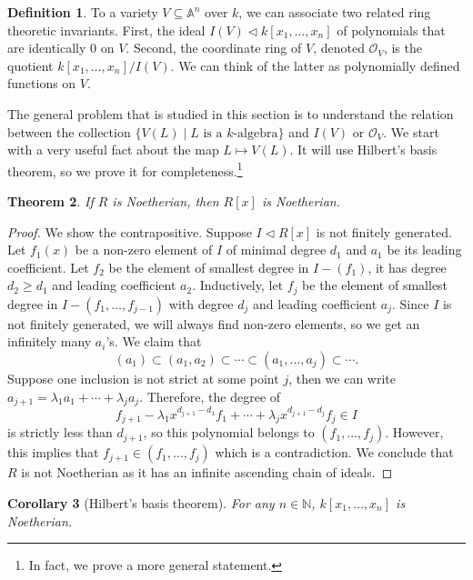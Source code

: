 \documentclass{tufte-handout} %
\newtheorem{thm}{Theorem}
\newtheorem{cor}[thm]{Corollary}
\theoremstyle{definition}
\newtheorem{defn}[thm]{Definition}
\theoremstyle{remark}
\newtheorem{rem}[thm]{Remark}
\newcommand{\N}{\mathbb{N}}
\newcommand{\bA}{\mathbb{A}}
\newcommand{\mO}{\mathcal{O}}
\begin{document}
\begin{defn}
	To a variety $V \subseteq \bA^n$ over $k$, we can associate two related ring theoretic invariants. First, the ideal $I(V) \lhd k[x_1, \dots, x_n]$ of polynomials that are identically $0$ on $V$. Second, the coordinate ring of $V$, denoted $\mO_V$, is the quotient $k[x_1, \dots, x_n]/I(V)$. We can think of the latter as polynomially defined functions on $V$.
\end{defn}


The general problem that is studied in this section is to understand the relation between the collection \(\{V(L) \mid L \text{ is a $k$-algebra}\}\) and $I(V)$ or $\mO_V$. We start with a very useful fact about the map $L \mapsto V(L)$. It will use Hilbert's basis theorem, so we prove it for completeness.\footnote{In fact, we prove a more general statement.}
\begin{thm}
	If $R$ is Noetherian, then $R[x]$ is Noetherian.
\end{thm}
\begin{proof}
	We show the contrapositive. Suppose $I \lhd R[x]$ is not finitely generated. Let $f_1(x)$ be a non-zero element of $I$ of minimal degree $d_1$ and $a_1$ be its leading coefficient. Let $f_2$ be the element of smallest degree in $I-(f_1)$, it has degree $d_2 \geq d_1$ and leading coefficient $a_2$. Inductively, let $f_j$ be the element of smallest degree in $I - (f_1, \dots, f_{j-1})$ with degree $d_j$ and leading coefficient $a_j$. Since $I$ is not finitely generated, we will always find non-zero elements, so we get an infinitely many $a_i$'s. We claim that \[(a_1) \subset (a_1,a_2) \subset \cdots \subset (a_1, \dots, a_j) \subset\cdots.\]
	Suppose one inclusion is not strict at some point $j$, then we can write $a_{j+1} = \lambda_1 a_1+ \cdots +\lambda_j a_j$. Therefore, the degree of \[f_{j+1} - \lambda_1x^{d_{j+1}-d_1} f_1 + \cdots + \lambda_jx^{d_{j+1}-d_j}f_j \in I\] is strictly less than $d_{j+1}$, so this polynomial belongs to $(f_1, \dots, f_j)$. However, this implies that $f_{j+1} \in (f_1, \dots,f_j)$ which is a contradiction. We conclude that $R$ is not Noetherian as it has an infinite ascending chain of ideals.
\end{proof}
\begin{cor}[Hilbert's basis theorem]
	For any $n \in \N$, $k[x_1, \dots, x_n]$ is Noetherian.
\end{cor}
\end{document}
